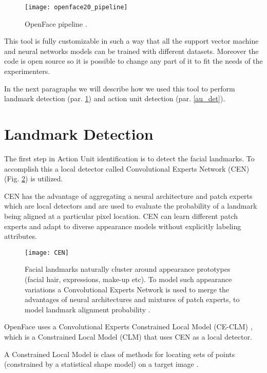 \begin{figure}[H]
	\centering
	\texttt{[image: openface20\_pipeline]}
	\caption{OpenFace pipeline \cite{Baltru2018}.}
	\label{fig:openface20_pipeline}
\end{figure}

This tool is fully customizable in such a way that all the support vector machine and neural networks models can be trained with different datasets. Moreover the code is open source so it is possible to change any part of it to fit the needs of the experimenters.

In the next paragraphs we will describe how we used this tool to perform landmark detection (par. \ref{landmark_det}) and action unit detection (par. \ref{au_det}).


\clearpage

\section{Landmark Detection} \label{landmark_det}

The first step in Action Unit identification is to detect the facial landmarks. To accomplish this a local detector called Convolutional Experts Network (CEN) (Fig. \ref{fig:CEN}) is utilized. 

CEN has the advantage of aggregating a neural architecture and patch experts which are local detectors and are used to evaluate the probability of a landmark being aligned at a particular pixel location. CEN can learn different patch experts and adapt to diverse appearance models without explicitly labeling attributes.

\begin{figure}[H]
	\centering
	\texttt{[image: CEN]}
	\caption{Facial landmarks naturally cluster around appearance prototypes (facial hair, expressions, make-up etc). To model such appearance variations a Convolutional Experts Network is used to merge the advantages of neural architectures and mixtures of patch experts, to model landmark alignment probability \cite{Baltru2017}.}
	\label{fig:CEN}
\end{figure}

OpenFace uses a Convolutional Experts Constrained Local Model (CE-CLM) \cite{Baltru2017}, which is a Constrained Local Model (CLM) that uses CEN as a local detector. 

A Constrained Local Model is class of methods for locating sets of points (constrained by a statistical shape model) on a target image \cite{clm_cootes}.

